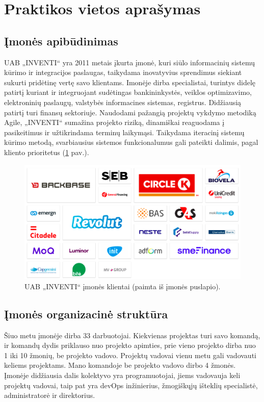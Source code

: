 \section{Praktikos vietos aprašymas}

\subsection{Įmonės apibūdinimas}
UAB „INVENTI“ yra 2011 metais įkurta įmonė, kuri siūlo informacinių sistemų kūrimo ir integracijos paslaugas,
taikydama inovatyvius sprendimus siekiant sukurti pridėtinę vertę savo klientams.
Imonėje dirba specialistai, turintys didelę patirtį kuriant ir integruojant sudėtingas bankininkystės, veiklos optimizavimo, elektroninių paslaugų,
valstybės informacines sistemas, registrus. Didžiausią patirtį turi finansų sektoriuje.
Naudodami pažangią projektų vykdymo metodiką Agile, „INVENTI“ sumažina projekto riziką, dinamiškai reaguodama į pasikeitimus ir užtikrindama terminų laikymąsi.
Taikydama iteracinį sistemų kūrimo metodą, svarbiausius sistemos funkcionalumus gali pateikti dalimis, pagal kliento prioritetus (\ref{img:clients} pav.).

\begin{figure}[H]
    \centering
    \includegraphics[scale=0.4]{img/clients.png}
    \caption{UAB „INVENTI“ įmonės klientai (paimta iš įmonės puslapio).}
    \label{img:clients}
\end{figure}


\subsection{Įmonės organizacinė struktūra}
Šiuo metu įmonėje dirba 33 darbuotojai. Kiekvienas projektas turi savo komandą,
ir komandų dydis priklauso nuo projekto apimties, prie vieno projekto dirba nuo 1 iki 10 žmonių, be projekto vadovo. Projektų vadovai vienu metu gali
vadovauti keliems projektams. Mano komandoje be projekto vadovo dirbo 4 žmonės. Įmonėje didžiausia dalis kolektyvo yra programuotojai, jiems vadovauja keli projektų vadovai,
taip pat yra devOps inžinierius, žmogiškųjų išteklių specialistė, administratorė ir direktorius.


